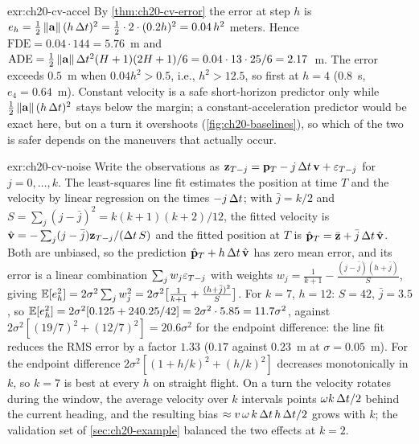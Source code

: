 
\begin{solution}{exr:ch20-cv-accel}
By \cref{thm:ch20-cv-error} the error at step $h$ is $e_h = \tfrac12 \left\lVert \mathbf{a} \right\rVert(h\,\Delta t)^2 = \tfrac12 \cdot 2 \cdot (0.2h)^2 = 0.04\,h^2$ meters. Hence $\mathrm{FDE} = 0.04 \cdot 144 = 5.76$~m and $\mathrm{ADE} = \tfrac12\left\lVert \mathbf{a} \right\rVert\Delta t^2 (H+1)(2H+1)/6 = 0.04 \cdot 13 \cdot 25/6 = 2.17$~m. The error exceeds $0.5$~m when $0.04h^2 > 0.5$, i.e., $h^2 > 12.5$, so first at $h = 4$ ($0.8$~s, $e_4 = 0.64$~m). Constant velocity is a safe short-horizon predictor only while $\tfrac12\left\lVert \mathbf{a} \right\rVert(h\,\Delta t)^2$ stays below the margin; a constant-acceleration predictor would be exact here, but on a turn it overshoots (\cref{fig:ch20-baselines}), so which of the two is safer depends on the maneuvers that actually occur.
\end{solution}

\begin{solution}{exr:ch20-cv-noise}
Write the observations as $\mathbf{z}_{T-j} = \mathbf{p}_T - j\,\Delta t\,\mathbf{v} + \mathbf{\varepsilon}_{T-j}$ for $j = 0, \dots, k$. The least-squares line fit estimates the position at time $T$ and the velocity by linear regression on the times $-j\,\Delta t$; with $\bar{j} = k/2$ and $S = \sum_j (j - \bar{j})^2 = k(k+1)(k+2)/12$, the fitted velocity is $\hat{\mathbf{v}} = -\sum_j (j - \bar{j})\mathbf{z}_{T-j}/(\Delta t\,S)$ and the fitted position at $T$ is $\hat{\mathbf{p}}_T = \bar{\mathbf{z}} + \bar{j}\,\Delta t\,\hat{\mathbf{v}}$. Both are unbiased, so the prediction $\hat{\mathbf{p}}_T + h\,\Delta t\,\hat{\mathbf{v}}$ has zero mean error, and its error is a linear combination $\sum_j w_j \mathbf{\varepsilon}_{T-j}$ with weights $w_j = \frac{1}{k+1} - \frac{(j - \bar{j})(h + \bar{j})}{S}$, giving $\mathbb{E}[e_h^2] = 2\sigma^2 \sum_j w_j^2 = 2\sigma^2\bigl[\frac{1}{k+1} + \frac{(h + \bar{j})^2}{S}\bigr]$. For $k = 7$, $h = 12$: $S = 42$, $\bar{j} = 3.5$, so $\mathbb{E}[e_h^2] = 2\sigma^2 [0.125 + 240.25/42] = 2\sigma^2 \cdot 5.85 = 11.7\sigma^2$, against $2\sigma^2[(19/7)^2 + (12/7)^2] = 20.6\sigma^2$ for the endpoint difference: the line fit reduces the RMS error by a factor $1.33$ ($0.17$ against $0.23$~m at $\sigma = 0.05$~m). For the endpoint difference $2\sigma^2[(1 + h/k)^2 + (h/k)^2]$ decreases monotonically in $k$, so $k = 7$ is best at every $h$ on straight flight. On a turn the velocity rotates during the window, the average velocity over $k$ intervals points $\omega k\,\Delta t/2$ behind the current heading, and the resulting bias $\approx v\,\omega\,k\,\Delta t\,h\,\Delta t/2$ grows with $k$; the validation set of \cref{sec:ch20-example} balanced the two effects at $k = 2$.
\end{solution}

